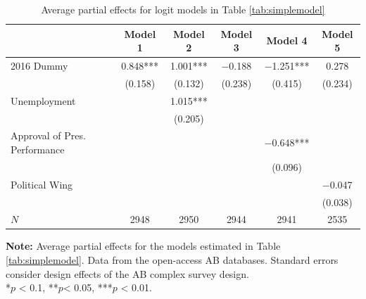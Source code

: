 \documentclass[12pt,a4]{article}
\begin{document}
\begin{table}[htbp]
\caption{Average partial effects for logit models in Table \ref{tab:simplemodel}}
\label{tab:apesimp}

\begin{tabular}[t]{lccccc}
\toprule
  & Model 1 & Model 2 & Model 3 & Model 4 & Model 5\\
\midrule
2016 Dummy & \num{0.848}*** & \num{1.001}*** & \num{-0.188} & \num{-1.251}*** & \num{0.278}\\
 & (\num{0.158}) & (\num{0.132}) & (\num{0.238}) & (\num{0.415}) & (\num{0.234})\\
Unemployment &  & \num{1.015}*** &  &  & \\
 &  & (\num{0.205}) &  &  & \\
Approval of Pres. Performance &  &  &  & \num{-0.648}*** & \\
 &  &  &  & (\num{0.096}) & \\
Political Wing &  &  &  &  & \num{-0.047}\\
 &  &  &  &  & (\num{0.038})\\
\midrule
$N$ & \num{2948} & \num{2950} & \num{2944} & \num{2941} & \num{2535}\\
\bottomrule
\end{tabular}


\vspace{0.25cm}
\textbf{Note:} Average partial effects for the models estimated in Table \ref{tab:simplemodel}. Data from the open-access AB databases. Standard errors consider design effects of the AB complex survey design.\\
*$p$ < 0.1, **$p$< 0.05, ***$p$ < 0.01.
\end{table}





\end{document}
